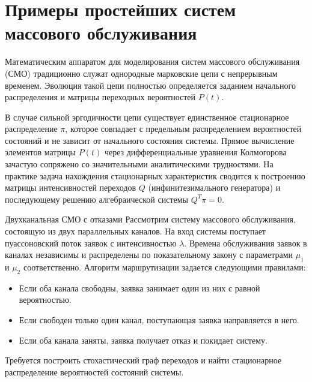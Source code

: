 \section{Примеры простейших систем массового обслуживания}

Математическим аппаратом для моделирования систем массового обслуживания (СМО) традиционно служат однородные марковские цепи с непрерывным временем. Эволюция такой цепи полностью определяется заданием начального распределения и матрицы переходных вероятностей $P(t)$. 

В случае сильной эргодичности цепи существует единственное стационарное распределение $\pi$, которое совпадает с предельным распределением вероятностей состояний и не зависит от начального состояния системы. Прямое вычисление элементов матрицы $P(t)$ через дифференциальные уравнения Колмогорова зачастую сопряжено со значительными аналитическими трудностями. На практике задача нахождения стационарных характеристик сводится к построению матрицы интенсивностей переходов $Q$ (инфинитезимального генератора) и последующему решению алгебраической системы $Q^T \pi = 0$.

\begin{example}{Двухканальная СМО с отказами}
Рассмотрим систему массового обслуживания, состоящую из двух параллельных каналов. На вход системы поступает пуассоновский поток заявок с интенсивностью $\lambda$. Времена обслуживания заявок в каналах независимы и распределены по показательному закону с параметрами $\mu_1$ и $\mu_2$ соответственно. Алгоритм маршрутизации задается следующими правилами:
\begin{itemize}
    \item Если оба канала свободны, заявка занимает один из них с равной вероятностью.
    \item Если свободен только один канал, поступающая заявка направляется в него.
    \item Если оба канала заняты, заявка получает отказ и покидает систему.
\end{itemize}
Требуется построить стохастический граф переходов и найти стационарное распределение вероятностей состояний системы.
\end{example}

